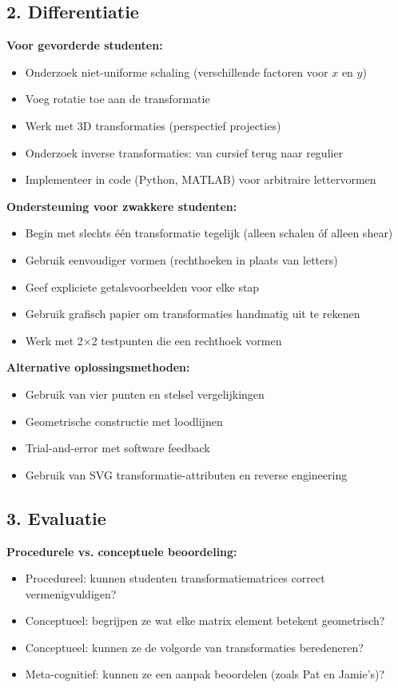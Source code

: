 \documentclass{ximera}
\begin{document}
\subsection*{2. Differentiatie}

\textbf{Voor gevorderde studenten:}
\begin{itemize}
\item Onderzoek niet-uniforme schaling (verschillende factoren voor $x$ en $y$)
\item Voeg rotatie toe aan de transformatie
\item Werk met 3D transformaties (perspectief projecties)
\item Onderzoek inverse transformaties: van cursief terug naar regulier
\item Implementeer in code (Python, MATLAB) voor arbitraire lettervormen
\end{itemize}

\textbf{Ondersteuning voor zwakkere studenten:}
\begin{itemize}
\item Begin met slechts één transformatie tegelijk (alleen schalen óf alleen shear)
\item Gebruik eenvoudiger vormen (rechthoeken in plaats van letters)
\item Geef expliciete getalsvoorbeelden voor elke stap
\item Gebruik grafisch papier om transformaties handmatig uit te rekenen
\item Werk met 2×2 testpunten die een rechthoek vormen
\end{itemize}

\textbf{Alternative oplossingsmethoden:}
\begin{itemize}
\item Gebruik van vier punten en stelsel vergelijkingen
\item Geometrische constructie met loodlijnen
\item Trial-and-error met software feedback
\item Gebruik van SVG transformatie-attributen en reverse engineering
\end{itemize}

\subsection*{3. Evaluatie}

\textbf{Procedurele vs. conceptuele beoordeling:}
\begin{itemize}
\item Procedureel: kunnen studenten transformatiematrices correct vermenigvuldigen?
\item Conceptueel: begrijpen ze wat elke matrix element betekent geometrisch?
\item Conceptueel: kunnen ze de volgorde van transformaties beredeneren?
\item Meta-cognitief: kunnen ze een aanpak beoordelen (zoals Pat en Jamie's)?
\end{itemize}
\end{document}
